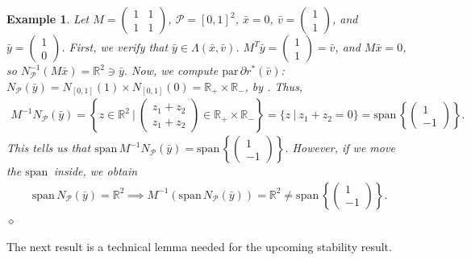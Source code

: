 \documentclass[reqno]{amsart}
\newtheorem{example}[proposition]{Example}
\numberwithin{equation}{section}
\newcommand{\R}{\mathbb{R}}
\newcommand{\pol}{\mathcal{P}}
\newcommand{\x}{\bar{x}}
\newcommand{\para}{\mathrm{par}\,}
\newcommand{\lin}{\mathrm{span}\,}
\begin{document}
\begin{example}
    Let $M = \begin{pmatrix}
        1 & 1 \\ 1 & 1
    \end{pmatrix}$, $\pol = [0, 1]^2$, $\x = 0$, $\bar v = \begin{pmatrix}
        1 \\ 1
    \end{pmatrix}$, and $\bar y = \begin{pmatrix}
        1 \\ 0
    \end{pmatrix}$.
    First, we verify that $\bar y \in \Lambda (\bar x, \bar v)$.
    $M^T \bar y = \begin{pmatrix}
        1 \\ 1
    \end{pmatrix} = \bar v$, and $M \x = 0$, so $N_{\pol}^{-1}(M \x) = \R^2 \ni \bar y$. Now, we compute $\para \partial r^*(\bar v)$: $N_{\pol}(\bar y) = N_{[0,1]}(1) \times N_{[0, 1]}(0) = \R_{+} \times \R_{-}$, by \cite[Theorem 6.10]{RoW 98}.
    Thus, \begin{align*}
        M^{-1}N_{\pol}(\bar{y}) = \left\{z \in \R^2 \ | \ \begin{pmatrix}
        z_1 + z_2 \\
        z_1 + z_2
    \end{pmatrix} \in \R_{+} \times \R_{-}\right\} = \{z \ | \ z_1 + z_2 = 0\} = \lin \left\{\begin{pmatrix}
        1 \\ -1
    \end{pmatrix}\right\}.
    \end{align*} This tells us that $\lin M^{-1} N_{\pol} (\bar y) = \lin \left\{\begin{pmatrix}
        1 \\ -1
    \end{pmatrix}\right\}$. However, if we move the $\lin$ inside, we obtain \begin{align*}
        \lin N_{\pol}(\bar y) = \R^2 \implies M^{-1}(\lin N_{\pol}(\bar y)) = \R^2 \neq \lin \left\{\begin{pmatrix}
        1 \\ -1
    \end{pmatrix}\right\}.
    \end{align*}
    \hfill $\diamond$
\end{example}

\noindent
 The next result is a technical lemma needed for the upcoming stability result.
\end{document}
